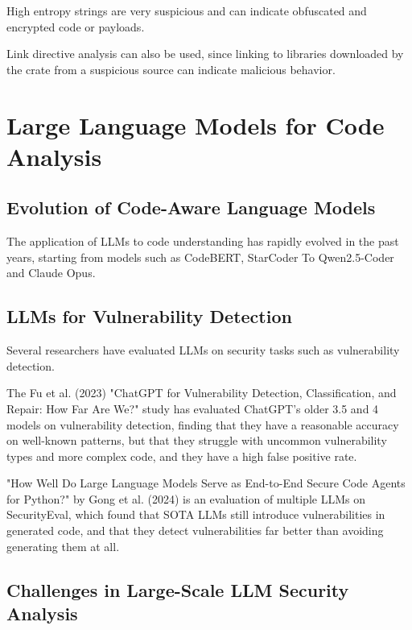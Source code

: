 High entropy strings are very suspicious and can indicate obfuscated and encrypted code or payloads.

Link directive analysis can also be used, since linking to libraries downloaded by the crate from a suspicious source can indicate malicious behavior.

\section{Large Language Models for Code Analysis}\label{sect:llm-code-analysis}

\subsection{Evolution of Code-Aware Language Models}\label{sect:evolution-code-aware-models}

The application of LLMs to code understanding has rapidly evolved in the past years, starting from models such as CodeBERT, StarCoder To Qwen2.5-Coder and Claude Opus. 

\subsection{LLMs for Vulnerability Detection}\label{sect:llm-vulnerability-detection}

Several researchers have evaluated LLMs on security tasks such as vulnerability detection.

The Fu et al. (2023) "ChatGPT for Vulnerability Detection, Classification, and Repair: How Far Are We?" study has evaluated ChatGPT's older 3.5 and 4 models on vulnerability detection, finding that they have a reasonable accuracy on well-known patterns, but that they struggle with uncommon vulnerability types and more complex code, and they have a high false positive rate.

"How Well Do Large Language Models Serve as End-to-End Secure Code Agents for Python?" by Gong et al. (2024) is an evaluation of multiple LLMs on SecurityEval, which found that SOTA LLMs still introduce vulnerabilities in generated code, and that they detect vulnerabilities far better than avoiding generating them at all.

\subsection{Challenges in Large-Scale LLM Security Analysis}\label{sect:challenges-llm-security}

